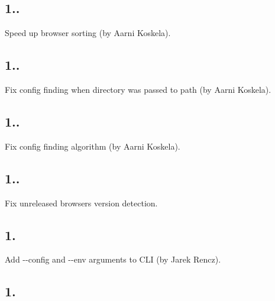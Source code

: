 \subsection*{1..}


\begin{DoxyItemize}
\item Speed up browser sorting (by Aarni Koskela).
\end{DoxyItemize}

\subsection*{1..}


\begin{DoxyItemize}
\item Fix config finding when directory was passed to {\ttfamily path} (by Aarni Koskela).
\end{DoxyItemize}

\subsection*{1..}


\begin{DoxyItemize}
\item Fix config finding algorithm (by Aarni Koskela).
\end{DoxyItemize}

\subsection*{1..}


\begin{DoxyItemize}
\item Fix unreleased browsers version detection.
\end{DoxyItemize}

\subsection*{1.}


\begin{DoxyItemize}
\item Add {\ttfamily -\/-\/config} and {\ttfamily -\/-\/env} arguments to C\+LI (by Jarek Rencz).
\end{DoxyItemize}

\subsection*{1.}


